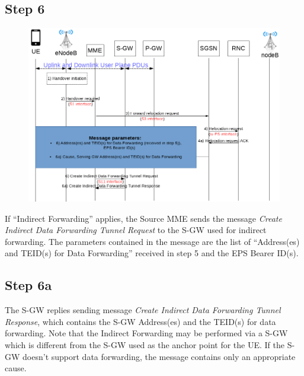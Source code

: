 \subsection*{Step 6}
\begin{figure}[!htb]
	\centering
	\includegraphics[width=0.9\linewidth]{img/preparation-6.png}
	\label{fig:8}
\end{figure}
If ``Indirect Forwarding'' applies, the Source MME sends the message \emph{Create
Indirect Data Forwarding Tunnel Request} to the S-GW used for indirect forwarding.
The parameters contained in the message are the list of ``Address(es) and TEID(s) for Data
Forwarding'' received in step 5 and the EPS Bearer ID(s).



\subsection*{Step 6a}
The S-GW replies sending message \emph{Create Indirect Data Forwarding Tunnel
Response}, which contains the S-GW Address(es) and the TEID(s) for data
forwarding. Note that the  Indirect Forwarding may be performed via a S-GW
which is different from the S-GW used as the anchor point for the UE.
If the S-GW doesn't support data forwarding, the message contains only an appropriate
cause.
